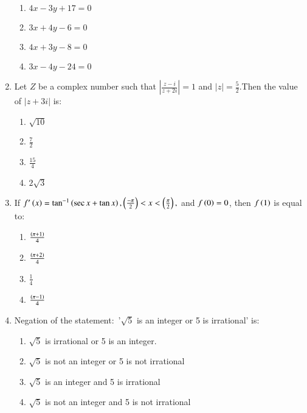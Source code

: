 \documentclass[journal,12pt,twocolumn]{IEEEtran}
\theoremstyle{remark}
\begin{document}
\begin{enumerate}
\begin{enumerate}
    \item $4x-3y+17=0$
    \item $3x+4y-6=0$
    \item $4x+3y-8=0$
    \item $3x-4y-24=0$
\end{enumerate}
\item Let $Z$ be a complex number such that $\left\lvert\frac{z-i}{z+2i}\right\rvert=1$ and $\lvert z \rvert=\frac{5}{2}$.Then the value of $\lvert z+3i\rvert$ is$\colon$
\begin{enumerate}
    \item $\sqrt{10}$
    \item $\frac{7}{2}$
    \item $\frac{15}{4}$
    \item $2\sqrt{3}$
\end{enumerate}
\item If $f^{\prime}\left(x\right)=\tan^{-1}\left(\sec x + \tan x\right),\left(\frac{-\pi}{2}\right)<x<\left(\frac{\pi}{2}\right),$ and $f\left(0\right)=0$, then $f\left(1\right)$ is equal to$\colon$
\begin{enumerate}
    \item $\frac{\left(\pi+1\right)}{4}$
    \item $\frac{\left(\pi+2\right)}{4}$
    \item $\frac{1}{4}$
    \item $\frac{\left(\pi-1\right)}{4}$
\end{enumerate}
\item Negation of the statement$\colon$ '$\sqrt{5}$ is an integer or 5 is irrational' is$\colon$
\begin{enumerate}
    \item $\sqrt{5}$ is irrational or 5 is an integer.
    \item $\sqrt{5}$ is not an integer or 5 is not irrational
    \item $\sqrt{5}$ is an integer and 5 is irrational
    \item $\sqrt{5}$ is not an integer and 5 is not irrational
\end{enumerate}

    







































    
\end{enumerate}
 
\end{document}
